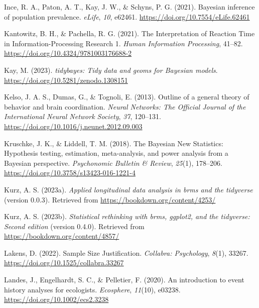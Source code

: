 \documentclass[
  man, donotrepeattitle,floatsintext]{apa6}
\newlength{\cslhangindent}
\newenvironment{CSLReferences}[2] %
 {\begin{list}{}{%
  \setlength{\itemindent}{0pt}
  \setlength{\leftmargin}{0pt}
  \setlength{\parsep}{0pt}
  \ifodd #1
   \setlength{\leftmargin}{\cslhangindent}
   \setlength{\itemindent}{-1\cslhangindent}
  \fi
  \setlength{\itemsep}{#2\baselineskip}}}
 {\end{list}}
\begin{document}
\begin{CSLReferences}{1}{0}
Ince, R. A., Paton, A. T., Kay, J. W., \& Schyns, P. G. (2021). Bayesian inference of population prevalence. \emph{eLife}, \emph{10}, e62461. \url{https://doi.org/10.7554/eLife.62461}

Kantowitz, B. H., \& Pachella, R. G. (2021). The {Interpretation} of {Reaction Time} in {Information-Processing Research} 1. \emph{Human Information Processing}, 41--82. \url{https://doi.org/10.4324/9781003176688-2}

Kay, M. (2023). \emph{{tidybayes}: Tidy data and geoms for {Bayesian} models}. \url{https://doi.org/10.5281/zenodo.1308151}

Kelso, J. A. S., Dumas, G., \& Tognoli, E. (2013). Outline of a general theory of behavior and brain coordination. \emph{Neural Networks: The Official Journal of the International Neural Network Society}, \emph{37}, 120--131. \url{https://doi.org/10.1016/j.neunet.2012.09.003}

Kruschke, J. K., \& Liddell, T. M. (2018). The {Bayesian New Statistics}: {Hypothesis} testing, estimation, meta-analysis, and power analysis from a {Bayesian} perspective. \emph{Psychonomic Bulletin \& Review}, \emph{25}(1), 178--206. \url{https://doi.org/10.3758/s13423-016-1221-4}

Kurz, A. S. (2023a). \emph{Applied longitudinal data analysis in brms and the tidyverse} (version 0.0.3). Retrieved from \url{https://bookdown.org/content/4253/}

Kurz, A. S. (2023b). \emph{Statistical rethinking with brms, ggplot2, and the tidyverse: {Second} edition} (version 0.4.0). Retrieved from \url{https://bookdown.org/content/4857/}

Lakens, D. (2022). Sample {Size Justification}. \emph{Collabra: Psychology}, \emph{8}(1), 33267. \url{https://doi.org/10.1525/collabra.33267}

Landes, J., Engelhardt, S. C., \& Pelletier, F. (2020). An introduction to event history analyses for ecologists. \emph{Ecosphere}, \emph{11}(10), e03238. \url{https://doi.org/10.1002/ecs2.3238}


\end{CSLReferences}
\end{document}
